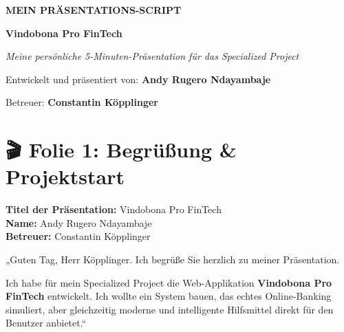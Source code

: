 \documentclass[11pt,a4paper]{article}
\begin{document}
\begin{tcolorbox}[
    colback=primarynavy,
    colframe=slideblue,
    arc=8pt,
    boxrule=3pt,
    left=20pt,
    right=20pt,
    top=40pt,
    bottom=40pt,
    coltext=white
]
    \centering
    {\huge\bfseries MEIN PRÄSENTATIONS-SCRIPT \par}
    \vspace{10pt}
    {\Large\bfseries Vindobona Pro FinTech \par}
    \vspace{15pt}
    {\large\itshape Meine persönliche 5-Minuten-Präsentation für das Specialized Project \par}
    \vspace{10pt}
    {\small Entwickelt und präsentiert von: \textbf{Andy Rugero Ndayambaje} \par}
    {\small Betreuer: \textbf{Constantin Köpplinger} \par}
\end{tcolorbox}

\newpage

\section{🎬 Folie 1: Begrüßung \& Projektstart}

\begin{tcolorbox}[colback=bglight, colframe=slideblue, title=\textbf{\color{white}Visualisierung auf Folie 1}, arc=4pt]
\textbf{Titel der Präsentation:} Vindobona Pro FinTech \\
\textbf{Name:} Andy Rugero Ndayambaje \\
\textbf{Betreuer:} Constantin Köpplinger
\end{tcolorbox}

\begin{tcolorbox}[colback=white, colframe=primarynavy, title=\textbf{Mein Sprechtext (Ich-Form)}]
„Guten Tag, Herr Köpplinger. Ich begrüße Sie herzlich zu meiner Präsentation.

Ich habe für mein Specialized Project die Web-Applikation \textbf{Vindobona Pro FinTech} entwickelt. Ich wollte ein System bauen, das echtes Online-Banking simuliert, aber gleichzeitig moderne und intelligente Hilfsmittel direkt für den Benutzer anbietet.“
\end{tcolorbox}
\end{document}
